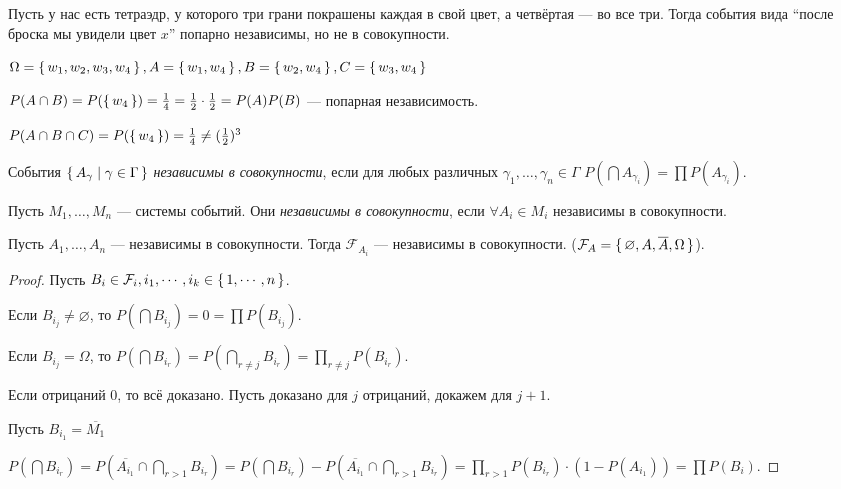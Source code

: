 \begin{example}
  Пусть у нас есть тетраэдр, у которого три грани покрашены каждая в свой цвет, а четвёртая --- во все три. 
  Тогда события вида ``после броска мы увидели цвет $x$'' попарно независимы, но не в совокупности.

  $\Omega = \set{w_1, w_2, w_3, w_4}, A= \set{w_1, w_4}, B = \set{w_2, w_4}, C = \set{w_3,w_4}$

  $P(A\cap B) = P(\set{w_4}) = \frac{1}{4} = \frac{1}{2} \cdot \frac{1}{2} = P(A)P(B)$ --- попарная независимость.
  
  $P(A\cap B\cap C) = P(\set{w_4}) = \frac{1}{4} \neq (\frac{1}{2})^3$
\end{example}

\begin{define*}
  События $\set{A_\gamma | \gamma \in \Gamma}$ \emph{независимы в совокупности}, если для любых различных $\gamma_1, \ldots, \gamma_n \in \Gamma$
  $P(\bigcap A_{\gamma_i}) = \prod P(A_{\gamma_i})$.

  Пусть $M_1, \ldots, M_n$ --- системы событий. Они \emph{независимы в совокупности}, если $\forall A_i \in M_i$ независимы в совокупности.
\end{define*}

\begin{example}
  Пусть $A_1,\ldots,A_n$ --- независимы в совокупности. Тогда $\mathcal{F}_{A_i}$ --- независимы в совокупности. 
  ($\mathcal{F}_A = \set{\varnothing, A, \overline{A}, \Omega}$).

  \begin{proof}
	Пусть $B_i \in \mathcal{F}_i, i_1,\cdots,i_k \in \set{1,\cdots,n}$.

	Если $B_{i_j} \neq \varnothing$, то $P(\bigcap B_{i_j}) = 0 = \prod P(B_{i_j})$.

	Если $B_{i_j} = \Omega$, то $P(\bigcap B_{i_r}) = P(\bigcap_{r\neq j} B_{i_r}) = \prod_{r\neq j}P(B_{i_r})$.

	Если отрицаний 0, то всё доказано. Пусть доказано для $j$ отрицаний, докажем для $j+1$.

	Пусть $B_{i_1} = \overline{M_1}$

	$P\left(\bigcap B_{i_r}\right) = P\left(\overline{A_{i_1}} \cap \bigcap_{r>1}B_{i_r}\right) 
	= P\left(\bigcap B_{i_r}\right) - P\left(\overline{A_{i_1}} \cap \bigcap_{r>1}B_{i_r}\right) 
	= \prod_{r>1} P(B_{i_r}) \cdot (1-P(A_{i_1})) = \prod P(B_i)$.
  \end{proof}
\end{example}



